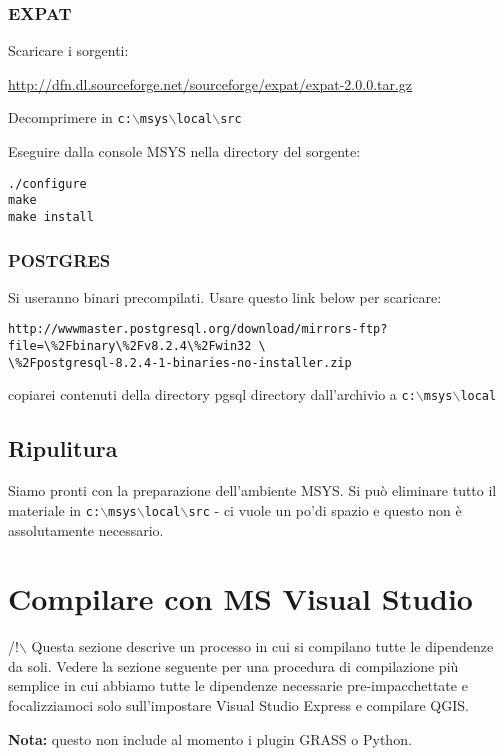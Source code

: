 \subsubsection{EXPAT}
Scaricare i sorgenti:

\url{http://dfn.dl.sourceforge.net/sourceforge/expat/expat-2.0.0.tar.gz}

Decomprimere in \texttt{c:$\backslash$msys$\backslash$local$\backslash$src}

Eseguire dalla console MSYS nella directory del sorgente:

\begin{verbatim}
./configure
make
make install
\end{verbatim}

\subsubsection{POSTGRES}
Si useranno binari precompilati. Usare questo link below per scaricare:

\begin{verbatim}
http://wwwmaster.postgresql.org/download/mirrors-ftp?file=\%2Fbinary\%2Fv8.2.4\%2Fwin32 \
\%2Fpostgresql-8.2.4-1-binaries-no-installer.zip
\end{verbatim}

copiarei contenuti della directory pgsql directory dall'archivio a  \texttt{c:$\backslash$msys$\backslash$local}

\subsection{Ripulitura}
Siamo pronti con la preparazione dell'ambiente MSYS. Si può eliminare tutto il materiale in \texttt{c:$\backslash$msys$\backslash$local$\backslash$src} - ci vuole un po'di spazio e questo non è assolutamente necessario.


\section{Compilare con MS Visual Studio}
/!$\backslash$ Questa sezione descrive un processo in cui si compilano tutte le dipendenze da soli. Vedere la sezione seguente per una procedura di compilazione più semplice in cui abbiamo tutte le dipendenze necessarie pre-impacchettate e focalizziamoci solo sull'impostare Visual Studio Express e compilare QGIS.

\textbf{Nota:} questo non include al momento i plugin GRASS o Python.

